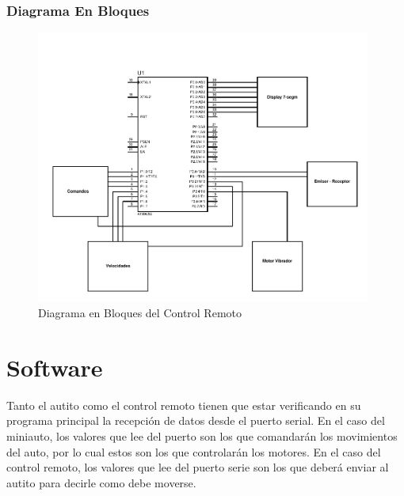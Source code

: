 \documentclass[a4paper,10pt]{article}
\begin{document}
			\subsubsection{Diagrama En Bloques}
				\begin{figure}[!htb]
						\centering
						\includegraphics[width=11cm]{Imagenes/DiagramaControl.pdf}
						\caption{Diagrama en Bloques del Control Remoto} \label{img002}
					\end{figure}
	
		\section{Software}
			Tanto el autito como el control remoto tienen que estar verificando en su programa principal la recepción de datos desde el puerto serial. En el caso del
			miniauto, los valores que lee del puerto son los que comandarán los movimientos del auto, por lo cual estos son los que controlarán los motores. En el
			caso del control remoto, los valores que lee del puerto serie son los que deberá enviar al autito para decirle como debe moverse. 
\end{document}
